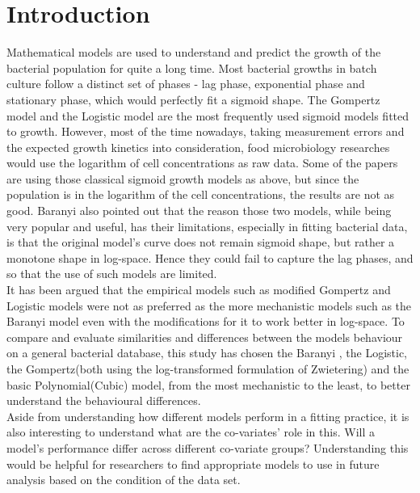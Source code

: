 \documentclass[11pt]{article}
\begin{document}
\section{Introduction}
Mathematical models are used to understand and predict the growth of the bacterial population for quite a long time. Most bacterial growths in batch culture follow a distinct set of phases - lag phase, exponential phase and stationary phase, which would perfectly fit a sigmoid shape. The Gompertz model\parencite{gompertz1825xxiv} and the Logistic model \parencite{verhulst1838notice} are the most frequently used sigmoid models fitted to growth\parencite{tjorve2017use}. However, most of the time nowadays, taking measurement errors and the expected growth kinetics into consideration, food microbiology researches would use the logarithm of cell concentrations as raw data. Some of the papers are using those classical sigmoid growth models as above, but since the population is in the logarithm of the cell concentrations, the results are not as good\parencite{baranyi2011modelling}.
Baranyi also pointed out that the reason those two models, while being very popular and useful, has their limitations, especially in fitting bacterial data, is that the original model's curve does not remain sigmoid shape, but rather a monotone shape in log-space. Hence they could fail to capture the lag phases, and so that the use of such models are limited\parencite{baranyi2011modelling}.\\
It has been argued that the empirical models such as modified Gompertz and Logistic models were not as preferred as the more mechanistic models such as the Baranyi model even with the modifications for it to work better in log-space\parencite{juneja2009mathematical}. To compare and evaluate similarities and differences between the models behaviour on a general bacterial database, this study has chosen the Baranyi \parencite{baranyi1993non}, the Logistic, the Gompertz(both using the log-transformed formulation of Zwietering)\parencite{zwietering1990modeling} and the basic Polynomial(Cubic) model, from the most mechanistic to the least, to better understand the behavioural differences. \\
Aside from understanding how different models perform in a fitting practice, it is also interesting to understand what are the co-variates' role in this. Will a model's performance differ across different co-variate groups? Understanding this would be helpful for researchers to find appropriate models to use in future analysis based on the condition of the data set.
\end{document}
